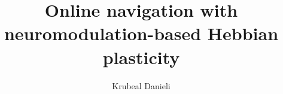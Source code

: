 \documentclass{article}
\begin{document}
\title{Online navigation with neuromodulation-based Hebbian plasticity}
\author{Krubeal Danieli}

\maketitle

\newpage

\tableofcontents

\newpage







\newpage



\newpage



\newpage



\newpage


\end{document}
